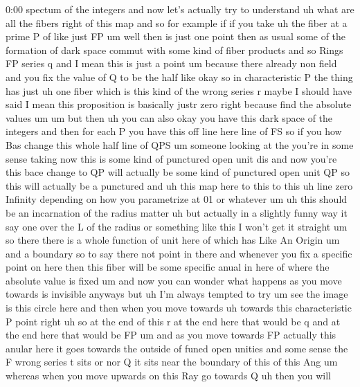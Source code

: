 \begin{unfinished}{0:00}
spectum  of  the
integers  and  now  let's  actually  try  to
understand  uh  what  are  all  the  fibers
right  of  this
map
and  so  for  example  if  if  you  take  uh  the
fiber  at  a  prime  P  of  like  just  FP
um  well  then  is  just  one  point  then  as
usual  some  of  the  formation  of  dark
space  commut  with  some  kind  of  fiber
products  and  so  Rings  FP  series
q  and  I  mean  this  is  just  a
point
um  because  there
already  non  field  and  you  fix  the  value
of  Q  to  be  the  half  like
okay  so  in  characteristic  P  the  thing
has  just  uh  one  fiber  which  is  this  kind
of  the  wrong  series
r
maybe  I  should  have  said  I  mean  this
proposition  is  basically  justr  zero
right  because  find  the  absolute
values
um  um  but  then  uh  you  can
also  okay  you  have  this  dark
space  of  the
integers  and  then  for  each  P  you  have
this  off  line
here  line  of
FS
so  if  you  how  Bas  change  this  whole  half
line  of  QPS  um  someone  looking  at
the  you're  in  some  sense
taking  now  this  is  some  kind
of  punctured  open  unit  dis  and  now
you're  this  bace  change  to  QP  will
actually  be  some  kind  of  punctured  open
unit  QP  so  this  will  actually  be  a
punctured
and  uh  this  map  here  to  this  to  this  uh
line  zero
Infinity  depending  on  how  you
parametrize  at  01  or  whatever
um  uh  this  should  be  an  incarnation  of
the  radius
matter  uh  but
actually  in  a  slightly  funny  way  it  say
one  over  the  L  of  the  radius  or
something  like  this  I  won't  get  it
straight
um  so  there  there  is  a  whole  function  of
unit  here  of  which  has  Like  An
Origin  um  and  a  boundary  so  to  say  there
not  point  in
there  and  whenever  you  fix  a  specific
point  on  here  then  this  fiber  will  be
some  specific  anual  in
here  of  where  the  absolute  value  is
fixed  um  and  now  you  can  wonder  what
happens  as  you  move
towards  is  invisible  anyways  but  uh  I'm
always  tempted  to  try
um  see  the  image  is  this  circle  here  and
then  when  you  move  towards  uh  towards
this  characteristic  P  point  right  uh  so
at  the  end  of  this  r  at  the  end  here
that  would  be  q  and  at  the  end  here  that
would  be
FP  um  and  as  you  move  towards  FP
actually  this  anular  here  it  goes
towards  the  outside  of  funed  open
unities  and  some  sense  the  F  wrong
series  t
sits  or  nor  Q  it  sits  near  the  boundary
of  this  of  this
Ang  um  whereas  when  you  move  upwards  on
this  Ray  go  towards  Q  uh  then  you  will

\end{unfinished}
